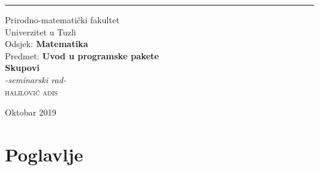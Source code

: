 \documentclass[a4paper, 14pt]{article}
\begin{document}
\begin{titlepage}
\raggedright
\rule{1pt}{\textheight}
\hspace{0.05\textwidth}
\parbox[b]{0.75\textwidth}{

{\large{Prirodno-matemati\v cki fakultet\\
Univerzitet u Tuzli\\
Odsjek: \textbf{Matematika}\\
Predmet: \textbf{Uvod u programske pakete}}}\\[7\baselineskip]
{\Huge\bfseries Skupovi}\\[1\baselineskip]
{\large\textit{-seminarski rad-}}\\[5\baselineskip]
{\Large\textsc{halilovi\' c adis}}

\vspace{0.5\textheight}

{\noindent Oktobar 2019}\\[\baselineskip]
}
\end{titlepage}

\tableofcontents
\thispagestyle{empty}
\newpage

\section{Poglavlje}
\end{document}
